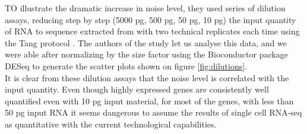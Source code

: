   TO illustrate the dramatic increase in noise level, they used series of dilution assays, reducing step by step (5000 pg, 500 pg, 50 pg, 10 pg) the input quantity of RNA to sequence extracted from  with two technical replicates each time using the Tang protocol \cite{tang10}. The authors of the study let us analyse this data, and we were able after normalizing by the size factor using the Bioconductor package DESeq \cite{anders10} to generate the scatter plots shown on figure \ref{fig:dilutions}. \\
  
  It is clear from these dilution assays that the noise level is correlated with the input quantity. Even though highly expressed genes are consistently well quantified even with 10 pg input material, for most of the genes, with less than 50 pg input RNA it seems dangerous to assume the results of single cell RNA-seq as quantitative with the current technological capabilities.
  
